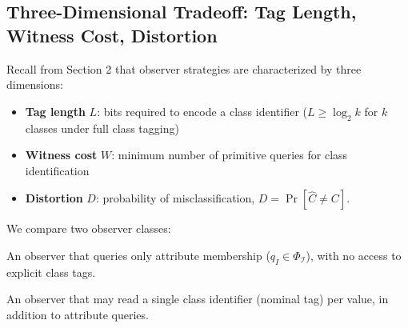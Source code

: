 \subsection{Three-Dimensional Tradeoff: Tag Length, Witness Cost, Distortion}

Recall from Section 2 that observer strategies are characterized by three dimensions:
\begin{itemize}
\item \textbf{Tag length} $L$: bits required to encode a class identifier ($L \geq \log_2 k$ for $k$ classes under full class tagging)
\item \textbf{Witness cost} $W$: minimum number of primitive queries for class identification
\item \textbf{Distortion} $D$: probability of misclassification, $D = \Pr[\hat{C} \neq C]$.
\end{itemize}

We compare two observer classes:

\begin{definition}
An observer that queries only attribute membership ($q_I \in \Phi_{\mathcal{I}}$), with no access to explicit class tags.
\end{definition}

\begin{definition}
An observer that may read a single class identifier (nominal tag) per value, in addition to attribute queries.
\end{definition}

